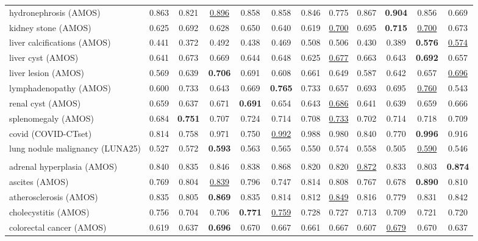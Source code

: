 \begin{minipage}{\textwidth}
{\begin{tabular}{@{}lccccccccccc@{}}
hydronephrosis (AMOS) & 0.863 & 0.821 & \underline{0.896} & 0.858 & 0.858 & 0.846 & 0.775 & 0.867 & \textbf{0.904} & 0.856 & 0.669 \\
kidney stone (AMOS) & 0.625 & 0.692 & 0.628 & 0.650 & 0.640 & 0.619 & \underline{0.700} & 0.695 & \textbf{0.715} & \underline{0.700} & 0.673 \\
liver calcifications (AMOS) & 0.441 & 0.372 & 0.492 & 0.438 & 0.469 & 0.508 & 0.506 & 0.430 & 0.389 & \textbf{0.576} & \underline{0.574} \\
liver cyst (AMOS) & 0.641 & 0.673 & 0.669 & 0.644 & 0.648 & 0.625 & \underline{0.677} & 0.663 & 0.643 & \textbf{0.692} & 0.657 \\
liver lesion (AMOS) & 0.569 & 0.639 & \textbf{0.706} & 0.691 & 0.608 & 0.661 & 0.649 & 0.587 & 0.642 & 0.657 & \underline{0.696} \\
lymphadenopathy (AMOS) & 0.600 & 0.733 & 0.643 & 0.669 & \textbf{0.765} & 0.733 & 0.657 & 0.693 & 0.695 & \underline{0.760} & 0.543 \\
renal cyst (AMOS) & 0.659 & 0.637 & 0.671 & \textbf{0.691} & 0.654 & 0.643 & \underline{0.686} & 0.641 & 0.639 & 0.659 & 0.666 \\
splenomegaly (AMOS) & 0.684 & \textbf{0.751} & 0.707 & 0.724 & 0.714 & 0.708 & \underline{0.733} & 0.702 & 0.714 & 0.718 & 0.709 \\
covid (COVID-CTset) & 0.814 & 0.758 & 0.971 & 0.750 & \underline{0.992} & 0.988 & 0.980 & 0.840 & 0.770 & \textbf{0.996} & 0.916 \\
lung nodule malignancy (LUNA25) & 0.527 & 0.572 & \textbf{0.593} & 0.563 & 0.565 & 0.550 & 0.574 & 0.558 & 0.505 & \underline{0.590} & 0.546 \\
\addlinespace
\multicolumn{12}{@{}l}{\textit{joint}} \\
adrenal hyperplasia (AMOS) & 0.840 & 0.835 & 0.846 & 0.838 & 0.868 & 0.820 & 0.820 & \underline{0.872} & 0.833 & 0.803 & \textbf{0.874} \\
ascites (AMOS) & 0.769 & 0.804 & \underline{0.839} & 0.796 & 0.747 & 0.814 & 0.808 & 0.767 & 0.678 & \textbf{0.890} & 0.810 \\
atherosclerosis (AMOS) & 0.835 & 0.805 & \textbf{0.869} & 0.835 & 0.814 & 0.812 & \underline{0.849} & 0.816 & 0.779 & 0.831 & 0.842 \\
cholecystitis (AMOS) & 0.756 & 0.704 & 0.706 & \textbf{0.771} & \underline{0.759} & 0.728 & 0.727 & 0.713 & 0.709 & 0.721 & 0.720 \\
colorectal cancer (AMOS) & 0.619 & 0.637 & \textbf{0.696} & 0.670 & 0.667 & 0.661 & 0.667 & 0.607 & \underline{0.679} & 0.670 & 0.637 \\

\end{tabular}}
\end{minipage}
